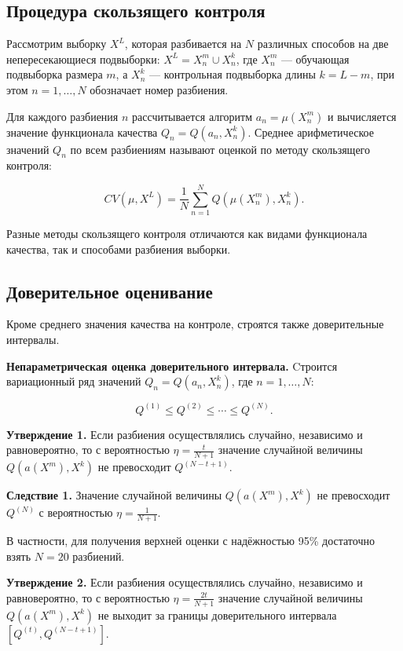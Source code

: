 \subsection{Процедура скользящего контроля}

Рассмотрим выборку $X^L$, которая разбивается на $N$ различных способов на две непересекающиеся подвыборки: $X^L = X^m_n \cup X^k_n$, где $X^m_n$ — обучающая подвыборка размера $m$, а $X^k_n$ — контрольная подвыборка длины $k = L - m$, при этом $n = 1, \ldots, N$ обозначает номер разбиения.

Для каждого разбиения $n$ рассчитывается алгоритм $a_n = \mu(X^m_n)$ и вычисляется значение функционала качества $Q_n = Q(a_n, X^k_n)$. Среднее арифметическое значений $Q_n$ по всем разбиениям называют оценкой по методу скользящего контроля:

\[
CV(\mu, X^L) = \frac{1}{N} \sum_{n=1}^N Q(\mu(X^m_n), X^k_n).
\]

Разные методы скользящего контроля отличаются как видами функционала качества, так и способами разбиения выборки.

\subsection{Доверительное оценивание}

Кроме среднего значения качества на контроле, строятся также доверительные интервалы.

\textbf{Непараметрическая оценка доверительного интервала.}
\newline
Cтроится вариационный ряд значений $Q_n = Q(a_n, X^k_n)$, где $n = 1, \ldots, N$:

\[
Q^{(1)} \leq Q^{(2)} \leq \cdots \leq Q^{(N)}.
\]

\textbf{Утверждение 1.} Если разбиения осуществлялись случайно, независимо и равновероятно, то с вероятностью $\eta = \frac{t}{N+1}$ значение случайной величины $Q(a(X^m), X^k)$ не превосходит $Q^{(N-t+1)}$.

\textbf{Следствие 1.} Значение случайной величины $Q(a(X^m), X^k)$ не превосходит $Q^{(N)}$ с вероятностью $\eta = \frac{1}{N+1}$.

В частности, для получения верхней оценки с надёжностью 95\% достаточно взять $N=20$ разбиений.

\textbf{Утверждение 2.} Если разбиения осуществлялись случайно, независимо и равновероятно, то с вероятностью $\eta = \frac{2t}{N+1}$ значение случайной величины $Q(a(X^m), X^k)$ не выходит за границы доверительного интервала $\left[ Q^{(t)}, Q^{(N-t+1)} \right]$.

